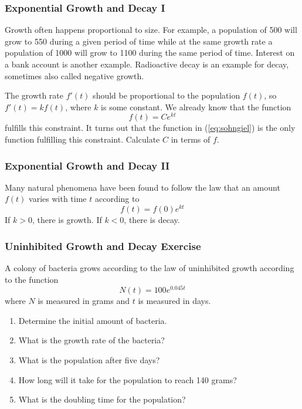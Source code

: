 \documentclass[xcolor=dvipsnames]{beamer}
\begin{document}
\begin{frame}
  \frametitle{Exponential Growth and Decay I}
  Growth often happens proportional to size. For example, a population
  of 500 will grow to 550 during a given period of time while at the
  same growth rate a population of 1000 will grow to 1100 during the
  same period of time. Interest on a bank account is another example.
  Radioactive decay is an example for decay, sometimes also called
  negative growth. 

\bigskip

The growth rate $f'(t)$ should be proportional to the population
$f(t)$, so $f'(t)=kf(t)$, where $k$ is some constant. We already know
that the function
\begin{equation}
  \label{eq:sohngiel}
  f(t)=Ce^{kt}
\end{equation}
fulfills this constraint. It turns out that the function in
(\ref{eq:sohngiel}) is the only function fulfilling this constraint.
Calculate $C$ in terms of $f$.
\end{frame}

\begin{frame}
  \frametitle{Exponential Growth and Decay II}
Many natural phenomena have been found to follow the law that an
amount $f(t)$ varies with time $t$ according to
  \begin{equation}
    \label{eq:lauwutho}
    f(t)=f(0)e^{kt}
  \end{equation}
If $k>0$, there is growth. If $k<0$, there is decay.
\end{frame}

\begin{frame}
  \frametitle{Uninhibited Growth and Decay Exercise}
A colony of bacteria grows according to the law of uninhibited growth
according to the function
\begin{equation}
  \label{eq:chiowezo}
  N(t)=100e^{0.045t}
\end{equation}
where $N$ is measured in grams and $t$ is measured in days.
  \begin{enumerate}
  \item<1-> Determine the initial amount of bacteria.
  \item<2-> What is the growth rate of the bacteria?
  \item<3-> What is the population after five days?
  \item<4-> How long will it take for the population to reach 140
    grams?
  \item<5-> What is the doubling time for the population?
  \end{enumerate}
\end{frame}
\end{document}
